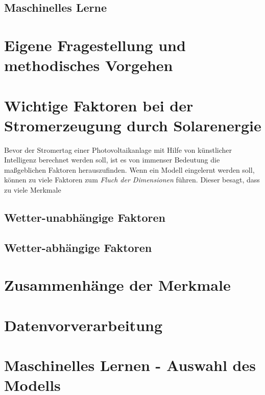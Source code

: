 \documentclass[12pt, a4paper]{article}
\begin{document}
\subsection{Maschinelles Lerne}

\newpage

\section{Eigene Fragestellung und methodisches Vorgehen}

\section{Wichtige Faktoren bei der Stromerzeugung durch Solarenergie}

Bevor der Stromertag einer Photovoltaikanlage mit Hilfe von künstlicher Intelligenz berechnet werden soll, ist es von immenser Bedeutung die maßgeblichen Faktoren herauszufinden. Wenn ein Modell eingelernt werden soll, können zu viele Faktoren zum \textit{Fluch der Dimensionen} führen. Dieser besagt, dass zu viele Merkmale 


\subsection{Wetter-unabhängige Faktoren}


\subsection{Wetter-abhängige Faktoren}


\newpage

\section{Zusammenhänge der Merkmale}

\newpage

\section{Datenvorverarbeitung}


\newpage

\section{Maschinelles Lernen - Auswahl des Modells}
\end{document}
